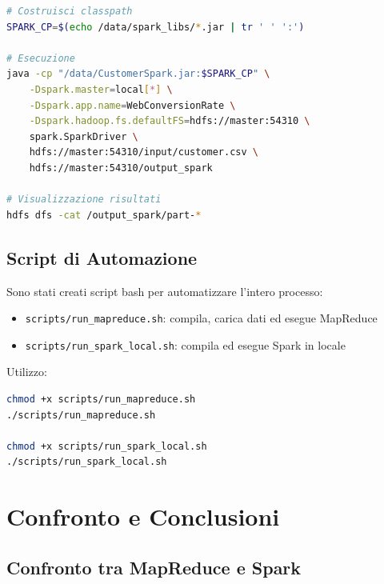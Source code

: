 \documentclass[a4paper, 12pt, oneside]{report}
\begin{document}
\begin{lstlisting}[language=bash,caption=Esecuzione job Spark]
# Costruisci classpath
SPARK_CP=$(echo /data/spark_libs/*.jar | tr ' ' ':')

# Esecuzione
java -cp "/data/CustomerSpark.jar:$SPARK_CP" \
    -Dspark.master=local[*] \
    -Dspark.app.name=WebConversionRate \
    -Dspark.hadoop.fs.defaultFS=hdfs://master:54310 \
    spark.SparkDriver \
    hdfs://master:54310/input/customer.csv \
    hdfs://master:54310/output_spark

# Visualizzazione risultati
hdfs dfs -cat /output_spark/part-*
\end{lstlisting}

\section{Script di Automazione}

Sono stati creati script bash per automatizzare l'intero processo:

\begin{itemize}
    \item \texttt{scripts/run\_mapreduce.sh}: compila, carica dati ed esegue MapReduce
    \item \texttt{scripts/run\_spark\_local.sh}: compila ed esegue Spark in locale
\end{itemize}

Utilizzo:
\begin{lstlisting}[language=bash]
chmod +x scripts/run_mapreduce.sh
./scripts/run_mapreduce.sh

chmod +x scripts/run_spark_local.sh
./scripts/run_spark_local.sh
\end{lstlisting}

\chapter{Confronto e Conclusioni}

\section{Confronto tra MapReduce e Spark}
\end{document}
